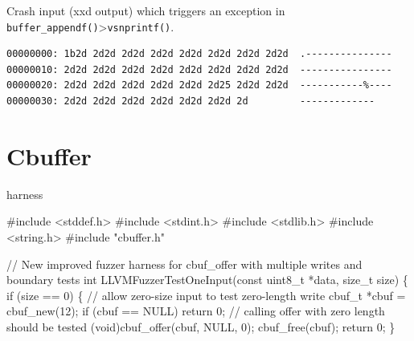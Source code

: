 \documentclass[
  a4paper,
]{scrreprt}
\newenvironment{Shaded}{\begin{snugshade}}{\end{snugshade}}
\newcommand{\CommentTok}[1]{\textcolor[rgb]{0.41,0.41,0.41}{#1}}
\newcommand{\ControlFlowTok}[1]{\textcolor[rgb]{0.85,0.12,0.09}{#1}}
\newcommand{\DataTypeTok}[1]{\textcolor[rgb]{0.47,0.16,0.63}{#1}}
\newcommand{\DecValTok}[1]{\textcolor[rgb]{0.47,0.16,0.63}{#1}}
\newcommand{\ImportTok}[1]{\textcolor[rgb]{0.33,0.33,0.33}{#1}}
\newcommand{\NormalTok}[1]{\textcolor[rgb]{0.33,0.33,0.33}{#1}}
\newcommand{\OperatorTok}[1]{\textcolor[rgb]{0.00,0.46,0.62}{#1}}
\newcommand{\PreprocessorTok}[1]{\textcolor[rgb]{0.47,0.16,0.63}{#1}}
\theoremstyle{definition}
\theoremstyle{remark}
\begin{document}
Crash input (xxd output) which triggers an exception in
\texttt{buffer\_appendf()}\textgreater{}\texttt{vsnprintf()}.

\begin{verbatim}
00000000: 1b2d 2d2d 2d2d 2d2d 2d2d 2d2d 2d2d 2d2d  .---------------
00000010: 2d2d 2d2d 2d2d 2d2d 2d2d 2d2d 2d2d 2d2d  ----------------
00000020: 2d2d 2d2d 2d2d 2d2d 2d2d 2d25 2d2d 2d2d  -----------%----
00000030: 2d2d 2d2d 2d2d 2d2d 2d2d 2d2d 2d         -------------
\end{verbatim}

\section{Cbuffer}\label{cbuffer}

harness

\begin{Shaded}
\begin{Highlighting}[numbers=left,,]
\PreprocessorTok{\#include }\ImportTok{\textless{}stddef.h\textgreater{}}
\PreprocessorTok{\#include }\ImportTok{\textless{}stdint.h\textgreater{}}
\PreprocessorTok{\#include }\ImportTok{\textless{}stdlib.h\textgreater{}}
\PreprocessorTok{\#include }\ImportTok{\textless{}string.h\textgreater{}}
\PreprocessorTok{\#include }\ImportTok{"cbuffer.h"}

\CommentTok{// New improved fuzzer harness for cbuf\_offer with multiple writes and boundary tests}
\DataTypeTok{int}\NormalTok{ LLVMFuzzerTestOneInput}\OperatorTok{(}\DataTypeTok{const} \DataTypeTok{uint8\_t} \OperatorTok{*}\NormalTok{data}\OperatorTok{,} \DataTypeTok{size\_t}\NormalTok{ size}\OperatorTok{)} \OperatorTok{\{}
    \ControlFlowTok{if} \OperatorTok{(}\NormalTok{size }\OperatorTok{==} \DecValTok{0}\OperatorTok{)} \OperatorTok{\{}
        \CommentTok{// allow zero{-}size input to test zero{-}length write}
\NormalTok{        cbuf\_t }\OperatorTok{*}\NormalTok{cbuf }\OperatorTok{=}\NormalTok{ cbuf\_new}\OperatorTok{(}\DecValTok{12}\OperatorTok{);}
        \ControlFlowTok{if} \OperatorTok{(}\NormalTok{cbuf }\OperatorTok{==}\NormalTok{ NULL}\OperatorTok{)}
            \ControlFlowTok{return} \DecValTok{0}\OperatorTok{;}
        \CommentTok{// calling offer with zero length should be tested}
        \OperatorTok{(}\DataTypeTok{void}\OperatorTok{)}\NormalTok{cbuf\_offer}\OperatorTok{(}\NormalTok{cbuf}\OperatorTok{,}\NormalTok{ NULL}\OperatorTok{,} \DecValTok{0}\OperatorTok{);}
\NormalTok{        cbuf\_free}\OperatorTok{(}\NormalTok{cbuf}\OperatorTok{);}
        \ControlFlowTok{return} \DecValTok{0}\OperatorTok{;}
    \OperatorTok{\}}


\end{Highlighting}
\end{Shaded}
\end{document}
